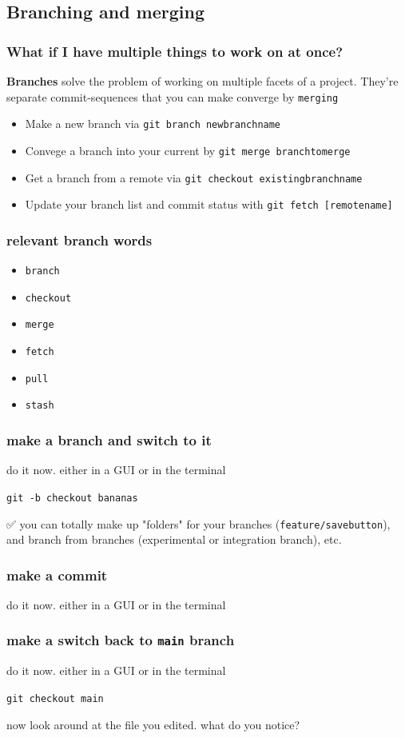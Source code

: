 \documentclass[14pt,aspectratio=1610]{beamer} %
\newcommand{\fframe}[2]{
   \begin{frame}
\frametitle{#1}
#2
\end{frame}
}
\begin{document}
\subsection{Branching and merging}

\fframe{What if I have multiple things to work on at once?}
{
	{\bf Branches} solve the problem of working on multiple facets of a project.  They're separate commit-sequences that you can make converge by {\tt merging}

	\vspace{\baselineskip}

	\begin{itemize}
		\item Make a new branch via {\tt git branch newbranchname}
		\item Convege a branch into your current by {\tt git merge branchtomerge}
		\item Get a branch from a remote via {\tt git checkout existingbranchname}
		\item Update your branch list and commit status with {\tt git fetch [remotename]}
	\end{itemize}

}


\fframe{relevant branch words}
{
	 \begin{itemize}
		\item {\tt branch}
		\item {\tt checkout}
		\item {\tt merge}
		\item {\tt fetch}
		\item {\tt pull}
		\item {\tt stash}
	\end{itemize}
}


\fframe{make a branch and switch to it}
{do it now.  either in a GUI or in the terminal

\vspace{\baselineskip}

{\tt git -b checkout bananas}

\vspace{\baselineskip}

✅ you can totally make up "folders" for your branches (\texttt{feature/savebutton}), and branch from branches (experimental or integration branch), etc.
}



\fframe{make a commit}
{do it now.  either in a GUI or in the terminal}

\fframe{make a switch back to {\tt main} branch}
{do it now.  either in a GUI or in the terminal

\texttt{git checkout main}

\vspace{\baselineskip}

now look around at the file you edited.  what do you notice?
}
\end{document}
